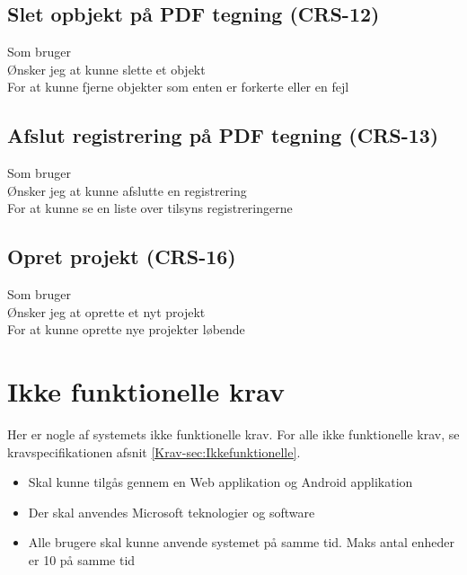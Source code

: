 	\subsection*{Slet opbjekt på PDF tegning (CRS-12)}
	Som bruger\\
	Ønsker jeg at kunne slette et objekt\\
	For at kunne fjerne objekter som enten er forkerte eller en fejl 

	\subsection*{Afslut registrering på PDF tegning (CRS-13)}
	Som bruger\\
	Ønsker jeg at kunne afslutte en registrering\\
	For at kunne se en liste over tilsyns registreringerne
	
	\subsection*{Opret projekt (CRS-16)}
	Som bruger\\
	Ønsker jeg at oprette et nyt projekt\\
	For at kunne oprette nye projekter løbende
	

	\section{Ikke funktionelle krav}
	Her er nogle af systemets ikke funktionelle krav. For alle ikke funktionelle krav, se kravspecifikationen afsnit \ref{Krav-sec:Ikkefunktionelle}.
	\begin{itemize}[-]
		\itemsep 0.3em 
		\item Skal kunne tilgås gennem en Web applikation og Android applikation
		\item Der skal anvendes Microsoft teknologier og software
		\item Alle brugere skal kunne anvende systemet på samme tid. Maks antal enheder er 10 på samme tid %
	\end{itemize}


